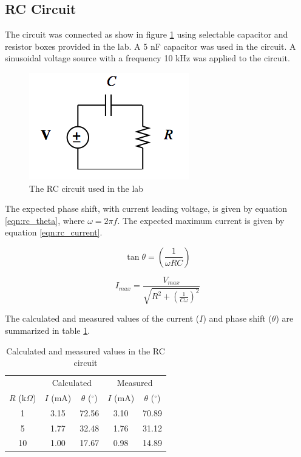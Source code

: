 \documentclass[12pt]{article}
\begin{document}
\subsection{RC Circuit}\label{sec:rc}
The circuit was connected as show in figure \ref{fig:rc} using selectable capacitor and resistor boxes provided in the lab. A 5 nF capacitor was used in the circuit. A sinusoidal voltage source with a frequency 10 kHz was applied to the circuit.

\begin{figure}[h]
	\centering
	\includegraphics[scale=0.6]{RC_circuit}
	\caption{The RC circuit used in the lab}
	\label{fig:rc}
\end{figure}

The expected phase shift, with current leading voltage, is given by equation \eqref{eqn:rc_theta}, where $\omega = 2\pi f$. The expected maximum current is given by equation \eqref{eqn:rc_current}.

\begin{equation}
	\tan { \theta  } =\left( \frac { 1 }{ \omega RC }  \right) 
	\label{eqn:rc_theta}
\end{equation}

\begin{equation}
		I_{max} = \frac{V_{max}}{\sqrt{R^2 + (\frac{1}{C\omega})^2} }
		\label{eqn:rc_current}
\end{equation}

\pagebreak
The calculated and measured values of the current ($I$) and phase shift ($\theta$) are summarized in table \ref{table:rc}.

\begin{table}[h]
	\centering
	\begin{tabular}{c c c c c}
		\toprule
		&				\multicolumn{2}{c}{Calculated}	& \multicolumn{2}{c}{Measured}	\\
		\cline{2-5}
		$R$ (k$\Omega$)	& $I$ (mA) 	& $\theta$ ($^\circ$) 	& $I$ (mA) 	& $\theta$ ($^\circ$) \\
		\hline
		1				& 3.15		& 72.56					& 3.10			&	70.89	\\
		5				& 1.77		& 32.48					& 1.76			&	31.12	\\
		10				& 1.00		& 17.67					& 0.98			&	14.89	\\
		\toprule
	\end{tabular}
	\caption{Calculated and measured values in the RC circuit}
	\label{table:rc}
\end{table}
\end{document}
